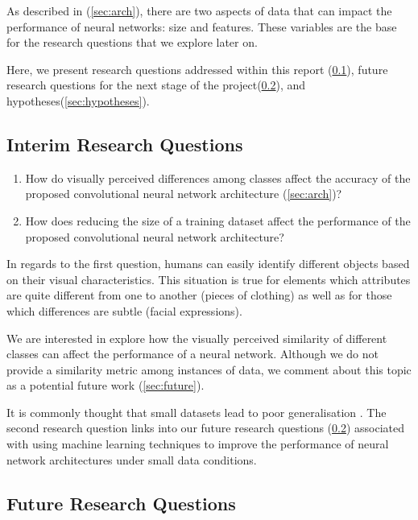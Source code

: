 \documentclass{article}
\begin{document}
As described in (\ref{sec:arch}), there are two aspects of data that can impact the performance of neural networks: size and features. These variables are the base for the research questions that we explore later on. 

Here, we present research questions addressed within this report (\ref{sec:irquestions}), future research questions for the next stage of the project(\ref{sec:frquestions}), and hypotheses(\ref{sec:hypotheses}).

\subsection{Interim Research Questions}
\label{sec:irquestions}

\begin{enumerate}
  \item How do visually perceived differences among classes affect the accuracy of the proposed convolutional neural network architecture (\ref{sec:arch})?
  \item How does reducing the size of a training dataset affect the performance of the proposed convolutional neural network architecture?
\end{enumerate}

In regards to the first question, humans can easily identify different objects based on their visual characteristics. This situation is true for elements which attributes are quite different from one to another (pieces of clothing) as well as for those which differences are subtle (facial expressions). 

We are interested in explore how the visually perceived similarity of different classes can affect the performance of a neural network. Although we do not provide a similarity metric among instances of data, we comment about this topic as a potential future work (\ref{sec:future}).

It is commonly thought that small datasets lead to poor generalisation \cite{lotsDataAndrew}. The second research question links into our future research questions (\ref{sec:frquestions}) associated with using machine learning techniques to improve the performance of neural network architectures under small data conditions.

\subsection{Future Research Questions}
\label{sec:frquestions}
\end{document}
